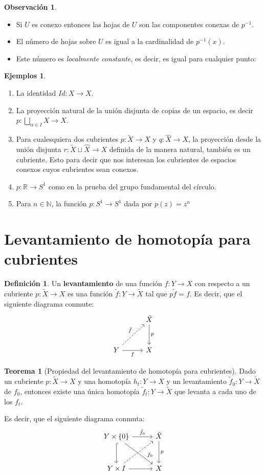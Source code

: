 \documentclass[spanish]{book}
\theoremstyle{definition}
\newtheorem*{defn}{Definición}
\newtheorem*{obs}{Observación}
\newtheorem*{teo}{Teorema}
\newtheorem*{ejems}{Ejemplos}
\newcommand{\R}{\mathbb{R}}
\newcommand{\N}{\mathbb{N}}
\begin{document}
	\begin{obs}\leavevmode
		\begin{itemize}
			\item Si $U$ es conexo entonces las hojas de $U$ son las componentes conexas de $p^{-1}$.
			\item El número de hojas sobre $U$ es igual a la cardinalidad de $p^{-1}(x)$.
			\item Este número es \textit{localmente constante}, es decir, es igual para cualquier punto:
		\end{itemize}
	\end{obs}\newpage
	
	\begin{ejems}\leavevmode
		\begin{enumerate}
			\item La identidad $Id:X\to X$.
			\item La proyección natural de la unión disjunta de copias de un espacio, es decir $p:\bigsqcup_{\alpha\in I}X\to X$.
			\item Para cualesquiera dos cubrientes $p:\tilde X\to X$ y $q:\hat X\to X$, la proyección desde la unión disjunta $r:\tilde{X}\sqcup\hat{X}\to X$ definida de la manera natural, también es un cubriente. Esto para decir que nos interesan los cubrientes de espacios conexos cuyos cubrientes sean conexos.
			\item $p:\R\to S^1$ como en la prueba del grupo fundamental del círculo.
			\item Para $n\in\N$, la función	$p:S^1\to S^1$ dada por $p(z)=z^n$
		\end{enumerate}
	\end{ejems}
\section{Levantamiento de homotopía para cubrientes}
\begin{defn}
	Un \textbf{levantamiento} de una función $f:Y\to X$ con respecto a un cubriente $p:\tilde{X}\to X$ es una función $\tilde{f}:Y\to\tilde{X}$ tal que $p\tilde{f}=f$. Es decir, que el siguiente diagrama conmute:
	\[\begin{tikzcd}[column sep=1cm,row sep=1cm]
		&\tilde{X}\arrow[d,"p"]\\
		Y\arrow[ur,dashed,"\tilde{f}"]\arrow[r,swap,"f"]&X
	\end{tikzcd}\]
	\begin{teo}[Propiedad del levantamiento de homotopía para cubrientes]\label{teo-lhc}
		Dado un cubriente $p:\tilde{X}\to X$ y una homotopía $h_t:Y\to X$ y un levantamiento $\tilde{f}_0:Y\to \tilde{X}$ de $f_0$, entonces existe una única homotopía $\tilde{f}_t:Y\to \tilde{X}$ que levanta a cada uno de los $f_t$.
		
		Es decir, que el siguiente diagrama conmuta:
		\[\begin{tikzcd}[column sep=1cm,row sep=1cm]
			Y\times\{0\}\arrow[r,"\tilde{f}_0"]\arrow[rd,"f_0" near end]\arrow[d,hook]&\tilde{X}\arrow[d,"p"]\\
			Y\times I\arrow[r]\arrow[ru,dashed]&X
		\end{tikzcd}\]
	\end{teo}
\end{defn}
\end{document}
